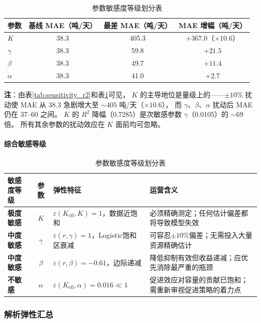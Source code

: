 \documentclass[12pt,a4paper]{ctexart}
\begin{document}
\begin{table}[htbp]
\begin{table}[htbp]
\centering
\caption{各参数扰动对 MAE 的影响排序（按偏离基线的最大增幅）}
\label{tab:sensitivity_mae}
\begin{tabular}{lccc}
\toprule
参数 & 基线 MAE（吨/天） & 最差 MAE（吨/天） & MAE 增幅（吨/天） \\
\midrule
$K$      & 38.3 & 405.3 & $+367.0$（$\times 10.6$）\\
$\gamma$ & 38.3 & 59.8  & $+21.5$ \\
$\beta$  & 38.3 & 49.7  & $+11.4$ \\
$\alpha$ & 38.3 & 41.0  & $+2.7$ \\
\bottomrule
\end{tabular}
\end{table}

\textbf{注}：由表\ref{tab:sensitivity_r2}和表\ref{tab:sensitivity_mae}可见，
$K$ 的主导地位是量级上的——$\pm 10\%$ 扰动使 MAE 从 38.3 急剧增大至 $\sim 405$ 吨/天（$\times 10.6$），
而 $\gamma$、$\beta$、$\alpha$ 扰动后 MAE 仍在 37--60 之间。
$K$ 的 $R^2$ 降幅（0.7285）是次敏感参数 $\gamma$（0.0105）的 $\sim 69$ 倍。
所有其余参数的扰动效应在 $K$ 面前均可忽略。

\paragraph{综合敏感等级}

\begin{table}[htbp]
\centering
\caption{参数敏感度等级划分表}
\label{tab:sensitivity_rank}
\begin{tabular}{l c l p{6cm}}
\toprule
敏感度等级 & 参数 & 弹性特征 & 运营含义 \\
\midrule
\textbf{极度敏感} & $K$ & $\varepsilon(K_{\text{eff}}, K)=1$，数据近饱和 & 必须精确测定；任何估计偏差都将导致模型失效 \\
\textbf{中度敏感} & $\gamma$ & $\varepsilon(r, \gamma)=1$，Logistic饱和区衰减 & 可容忍$\pm10\%$偏差；无需投入大量资源精确估计 \\
\textbf{中度敏感} & $\beta$ & $\varepsilon(r, \beta)=-0.61$，边际递减 & 降低抑制有效但收益递减；应优先消除最严重的瓶颈 \\
\textbf{不敏感} & $\alpha$ & $\varepsilon(K_{\text{eff}}, \alpha)=0.016 \ll 1$ & 促进效应对容量的贡献已饱和；需重新审视促进策略的着力点 \\
\bottomrule
\end{tabular}
\end{table}

\subsubsection{解析弹性汇总}


\end{table}
\end{document}
